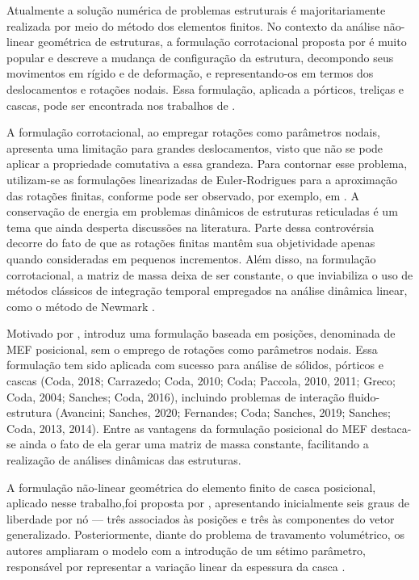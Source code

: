 Atualmente a solução numérica de problemas estruturais é majoritariamente realizada por meio do método dos elementos finitos. No contexto da análise não-linear geométrica de estruturas, a formulação corrotacional proposta por  é muito popular e descreve a mudança de configuração da estrutura, decompondo seus movimentos em rígido e de deformação, e representando-os em termos dos deslocamentos e rotações nodais. Essa formulação, aplicada a pórticos, treliças e cascas, pode ser encontrada nos trabalhos de .

A formulação corrotacional, ao empregar rotações como parâmetros nodais, apresenta uma limitação para grandes deslocamentos, visto que não se pode aplicar a propriedade comutativa a essa grandeza. Para contornar esse problema, utilizam-se as formulações linearizadas de Euler-Rodrigues para a aproximação das rotações finitas, conforme pode ser observado, por exemplo, em . A conservação de energia em problemas dinâmicos de estruturas reticuladas é um tema que ainda desperta discussões na literatura. Parte dessa controvérsia decorre do fato de que as rotações finitas mantêm sua objetividade apenas quando consideradas em pequenos incrementos. Além disso, na formulação corrotacional, a matriz de massa deixa de ser constante, o que inviabiliza o uso de métodos clássicos de integração temporal empregados na análise dinâmica linear, como o método de Newmark  \cite{SanchesC:2013}.

Motivado por ,  introduz uma formulação baseada em posições, denominada de MEF posicional, sem o emprego de rotações como parâmetros nodais. Essa formulação tem sido aplicada com sucesso para análise de sólidos, pórticos e cascas (Coda, 2018; Carrazedo;
Coda, 2010; Coda; Paccola, 2010, 2011; Greco; Coda, 2004; Sanches;
Coda, 2016), incluindo problemas de interação fluido-estrutura (Avancini; Sanches, 2020;
Fernandes; Coda; Sanches, 2019; Sanches; Coda, 2013, 2014). Entre as vantagens da formulação posicional do MEF destaca-se ainda o fato de ela gerar uma matriz de massa constante, facilitando a realização de análises dinâmicas das estruturas.

A formulação não-linear geométrica do elemento finito de casca posicional, aplicado nesse trabalho,foi proposta por \cite{CodaP:2007}, apresentando inicialmente seis graus de liberdade por nó — três associados às posições e três às componentes do vetor generalizado. Posteriormente, diante do problema de travamento volumétrico, os autores ampliaram o modelo com a introdução de um sétimo parâmetro, responsável por representar a variação linear da espessura da casca \cite{CodaP:2008}.

